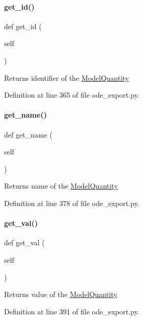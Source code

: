 \paragraph{\texorpdfstring{get\_id()}{get\_id()}}
{\footnotesize\ttfamily def get\+\_\+id (\begin{DoxyParamCaption}\item[{}]{self }\end{DoxyParamCaption})}

\begin{DoxyReturn}{Returns}
identifier of the \mbox{\hyperlink{classamici_1_1ode__export_1_1_model_quantity}{Model\+Quantity}} 
\end{DoxyReturn}


Definition at line 365 of file ode\+\_\+export.\+py.

\mbox{\label{classamici_1_1ode__export_1_1_model_quantity_ae13ea075e8de9101d02c0316ccb2ce79}} 
\paragraph{\texorpdfstring{get\_name()}{get\_name()}}
{\footnotesize\ttfamily def get\+\_\+name (\begin{DoxyParamCaption}\item[{}]{self }\end{DoxyParamCaption})}

\begin{DoxyReturn}{Returns}
name of the \mbox{\hyperlink{classamici_1_1ode__export_1_1_model_quantity}{Model\+Quantity}} 
\end{DoxyReturn}


Definition at line 378 of file ode\+\_\+export.\+py.

\mbox{\label{classamici_1_1ode__export_1_1_model_quantity_a5a59c7fdd0ea17bac5a6b07db3f027c5}} 
\paragraph{\texorpdfstring{get\_val()}{get\_val()}}
{\footnotesize\ttfamily def get\+\_\+val (\begin{DoxyParamCaption}\item[{}]{self }\end{DoxyParamCaption})}

\begin{DoxyReturn}{Returns}
value of the \mbox{\hyperlink{classamici_1_1ode__export_1_1_model_quantity}{Model\+Quantity}} 
\end{DoxyReturn}


Definition at line 391 of file ode\+\_\+export.\+py.

